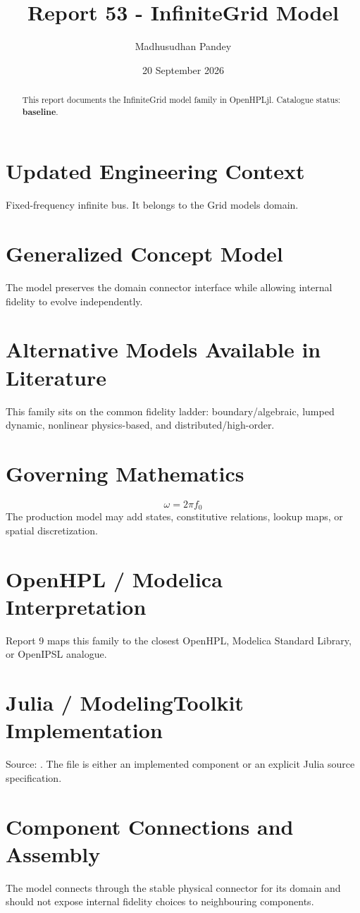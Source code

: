 \documentclass[10pt,a4paper]{article}
\title{Report 53 - InfiniteGrid Model}
\author{Madhusudhan Pandey}
\date{20 September 2026}
\begin{document}
\maketitle
\begin{abstract}This report documents the InfiniteGrid model family in OpenHPLjl. Catalogue status: \textbf{baseline}.\end{abstract}
\section{Updated Engineering Context}Fixed-frequency infinite bus. It belongs to the Grid models domain.
\section{Generalized Concept Model}The model preserves the domain connector interface while allowing internal fidelity to evolve independently.
\section{Alternative Models Available in Literature}This family sits on the common fidelity ladder: boundary/algebraic, lumped dynamic, nonlinear physics-based, and distributed/high-order.
\section{Governing Mathematics}\[\omega=2\pi f_0\]The production model may add states, constitutive relations, lookup maps, or spatial discretization.
\section{OpenHPL / Modelica Interpretation}Report 9 maps this family to the closest OpenHPL, Modelica Standard Library, or OpenIPSL analogue.
\section{Julia / ModelingToolkit Implementation}Source: \texttt{}. The file is either an implemented component or an explicit Julia source specification.
\section{Component Connections and Assembly}The model connects through the stable physical connector for its domain and should not expose internal fidelity choices to neighbouring components.
\end{document}
